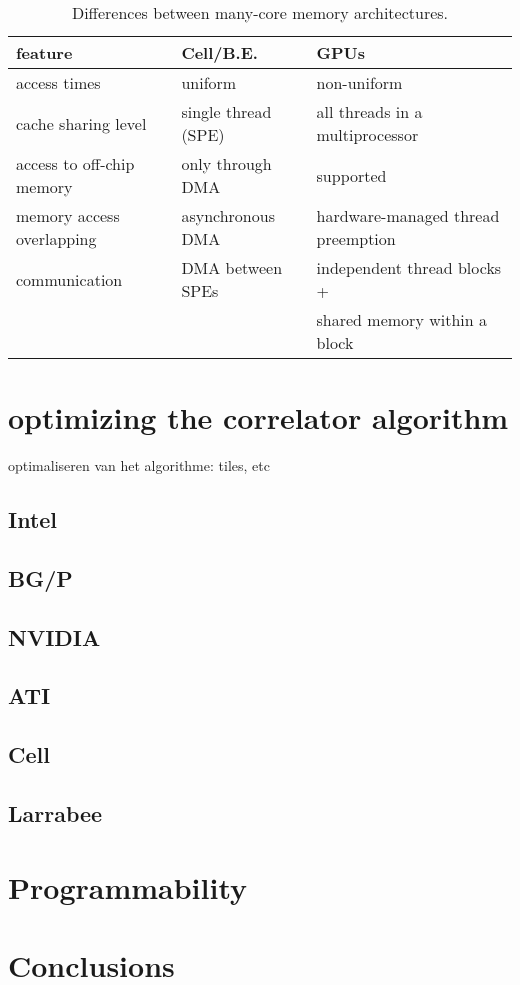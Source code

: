 \documentclass{article}
\begin{document}
\begin{table*}[t]
\begin{center}
{\small
\begin{tabular}{l|l|l}
feature                   & Cell/B.E.                      & GPUs \\
\hline
access times              & uniform                        & non-uniform \\
cache sharing level       & single thread (SPE)            & all threads in a multiprocessor \\
access to off-chip memory & only through DMA               & supported \\
memory access overlapping & asynchronous DMA               & hardware-managed thread preemption \\
communication             & DMA between SPEs               & independent thread blocks + \\
                          &                                & shared memory within a block \\
\end{tabular}
} %
\end{center}
\vspace{-0.5cm}
\caption{Differences between many-core memory architectures.}
\label{memory-properties}
\end{table*}


\section {optimizing the correlator algorithm}
\- optimaliseren van het algorithme: tiles, etc
\subsection{Intel}
\subsection{BG/P}
\subsection{NVIDIA}
\subsection{ATI}
\subsection{Cell}
\subsection{Larrabee}

 
\section{Programmability}


\section{Conclusions}




\end{document}
